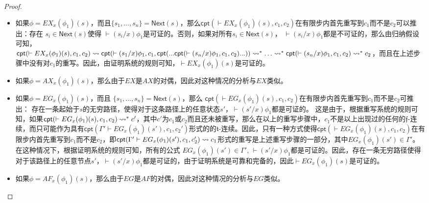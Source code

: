\begin{proof}
\begin{itemize}
		\item 如果$\phi = EX_x(\phi_1)(s)$，而且$\{s_1,...,s_n\}=\textsf{Next}(s)$，那么$\textsf{cpt}(\vdash EX_x(\phi_1)(s),c_1,c_2)$在有限步内首先重写到$c_1$而不是$c_2$可以推出：存在 $s_i\in\textsf{Next}(s)$使得 $\vdash(s_i/x)\phi_1$是可证的。否则，如果对所有$s_i\in\textsf{Next}(s)$， $\vdash(s_i/x)\phi_1$都是不可证的，那么由归纳假设可知，\\
		$\textsf{cpt}(\vdash EX_x(\phi_1)(s),c_1,c_2)\rightsquigarrow\\
		\textsf{cpt}(\vdash(s_1/x)\phi_1,c_1,\textsf{cpt}(...\textsf{cpt}(\vdash(s_n/x)\phi_1,c_1,c_2)...))\\\rightsquigarrow^*\ldots\rightsquigarrow^*\\
		\textsf{cpt}(\vdash (s_n/x)\phi_1,c_1,c_2)\rightsquigarrow^*c_2$，而且在上述步骤中没有对$c_1$的重写。因此，由证明系统的规则可知，$\vdash EX_x(\phi_1)(s)$是可证的。
		
		\item 如果$\phi = AX_x(\phi_1)(s)$，那么由于$EX$是$AX$的对偶，因此对这种情况的分析与$EX$类似。
		
		\item 如果$\phi = EG_x(\phi_1)(s)$，而且 $\{s_1,...,s_n\}=\textsf{Next}(s)$，那么 $\textsf{cpt}(\vdash EG_x(\phi_1)(s), c_1, c_2)$在有限步内首先重写到$c_1$而不是$c_2$可推出： 存在一条起始于$s$的无穷路径，使得对于这条路径上的任意状态$s'$，$\vdash(s'/x)\phi_1$都是可证的。 这是由于，根据重写系统的规则可知，如果$\textsf{cpt}(\vdash EG_x(\phi_1)(s), c_1, c_2)\rightsquigarrow^*c'$，其中$c'$为$c_1$或$c_2$而且还未被重写，那么在以上的重写步骤中，$c_1$不是以上出现过的任何\CPT{}的$\mathfrak{f}$-连续，而只可能作为具有$\textsf{cpt}(\Gamma'\vdash EG_x(\phi_1)(s'), c_1, c_2')$形式的\CPT{}的$\mathfrak{t}$-连续。因此，只有一种方式使得$\textsf{cpt}(\vdash EG_x(\phi_1)(s), c_1, c_2)$在有限步内首先重写到$c_1$而不是$c_2$，即$\textsf{cpt}(\Gamma'\vdash EG_x(\phi_1)(s'), c_1, c_2')\rightsquigarrow c_1$形式的重写是上述重写步骤的一部分，其中$EG_x(\phi_1)(s')\in\Gamma'$。在这种情况下，根据证明系统的规则可知，所有的公式 $EG_x(\phi_1)(s')\in\Gamma'$, $\vdash(s'/x)\phi_1$都是可证的。因此，存在一条无穷路径使得对于该路径上的任意节点$s'$，$\vdash(s'/x)\phi_1$都是可证的，由于证明系统是可靠和完备的，因此$\vdash EG_x(\phi_1)(s)$是可证的。
		
		\item 
		如果$\phi = AF_x(\phi_1)(s)$，那么由于$EG$是$AF$的对偶，因此对这种情况的分析与$EG$类似。
		

\end{itemize}
\end{proof}
